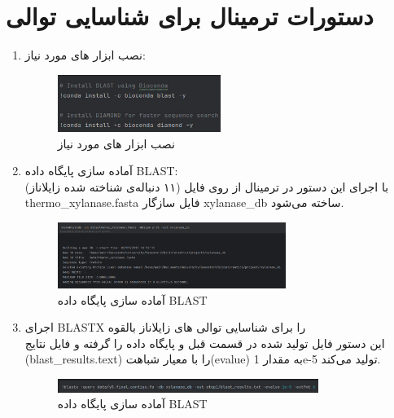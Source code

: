     \section{دستورات ترمینال برای شناسایی توالی}
        \begin{enumerate}
            \item نصب ابزار های مورد نیاز:
                \begin{figure}[H]
                    \centering
                    \includegraphics[width=0.5\textwidth]{images/install_blast.jpg} %
                    \caption{نصب ابزار های مورد نیاز}
                    \label{fig:install_blast}
                \end{figure}
            \item  آماده سازی پایگاه داده BLAST:\\
                با اجرای این دستور در ترمینال از روی فایل (۱۱ دنباله‌ی شناخته شده زایلاناز) thermo\_xylanase.fasta فایل سازگار xylanase\_db ساخته می‌شود.
                \begin{figure}[H]
                    \centering
                    \includegraphics[width=0.7\textwidth]{images/blast_database.png} %
                    \caption{آماده سازی پایگاه داده BLAST }
                    \label{fig:blast_database}
                \end{figure}

            \item اجرای BLASTX را برای شناسایی توالی های زایلاناز   بالقوه \\
                این دستور فایل تولید شده در قسمت قبل و پایگاه داده را گرفته و فایل نتایج (blast\_results.text) را با معیار شباهت(evalue) به مقدار 1e-5  تولید می‌کند.
                \begin{figure}[H]
                    \centering
                    \includegraphics[width=0.8\textwidth]{images/run_blast.jpg} %
                    \caption{آماده سازی پایگاه داده BLAST }
                    \label{fig:run_blast}
                \end{figure}
                


\end{enumerate}
